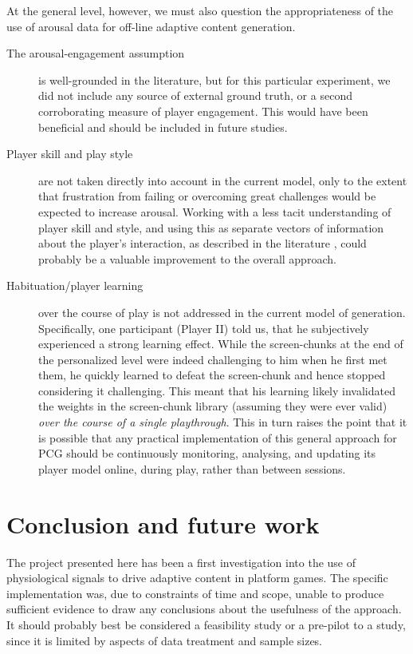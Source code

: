 \documentclass{llncs}
\begin{document}
At the general level, however, we must also question the appropriateness of the use of arousal data for off-line adaptive content generation.
\begin{description}
\item [The arousal-engagement assumption] is well-grounded in the literature, but for this particular experiment, we did not include any source of external ground truth, or a second corroborating measure of player engagement. This would have been beneficial and should be included in future studies.
\item [Player skill and play style] are not taken directly into account in the current model, only to the extent that frustration from failing or overcoming great challenges would be expected to increase arousal. Working with a less tacit understanding of player skill and style, and using this as separate vectors of information about the player's interaction, as described in the literature \cite{shaker2010towards}, could probably be a valuable improvement to the overall approach.
\item [Habituation/player learning] over the course of play is not addressed in the current model of generation. Specifically, one participant (Player II) told us, that he subjectively experienced a strong learning effect. While the screen-chunks at the end of the personalized level were indeed challenging to him when he first met them, he quickly learned to defeat the screen-chunk and hence stopped considering it challenging. This meant that his learning likely invalidated the weights in the screen-chunk library (assuming they were ever valid) \emph{over the course of a single playthrough}.
This in turn raises the point that it is possible that any practical implementation of this general approach for PCG should be continuously monitoring, analysing, and updating its player model online, during play, rather than between sessions.
\end{description}

\section{Conclusion and future work}
The project presented here has been a first investigation into the use of physiological signals to drive adaptive content in platform games.
The specific implementation was, due to constraints of time and scope, unable to produce sufficient evidence to draw any conclusions about the usefulness of the approach.
It should probably best be considered a feasibility study or a pre-pilot to a study, since it is limited by aspects of data treatment and sample sizes.
\end{document}
